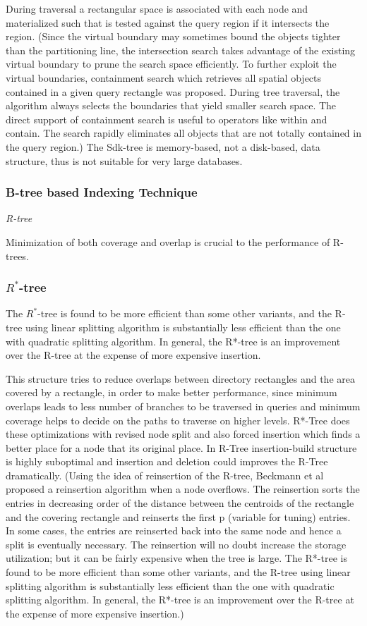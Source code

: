 \documentclass[a4paper,12pt]{article}
\begin{document}
During traversal a rectangular space is associated with each node and materialized  such that is tested against the query region if it intersects the region. 
(Since the virtual boundary may sometimes bound the objects tighter than the partitioning line, the intersection search takes advantage of the existing virtual boundary to prune the search space efficiently. To further exploit the virtual boundaries, containment search which retrieves all spatial objects contained in a given query rectangle was proposed. During tree traversal, the algorithm always selects the boundaries that yield smaller search space. The direct support of containment search is useful to operators like within and contain. The search rapidly eliminates all objects that are not totally contained in the query region.)
The Sdk-tree is memory-based, not a disk-based, data structure, thus is not suitable for very large databases.

\subsubsection{B-tree based Indexing Technique}
\emph{R-tree}
\label{rtree}

Minimization of both coverage and overlap is crucial to the performance of R-trees.
\subsubsection{$R^*$-tree}
The $R^*$-tree is found to be more efficient than some other variants, and the R-tree using linear splitting algorithm is substantially less efficient than the one with quadratic splitting algorithm. In general, the R*-tree is an improvement over the R-tree at the expense of more expensive insertion.

This structure tries to reduce overlaps between directory rectangles and the area covered by a rectangle, in order to make better performance, since minimum overlaps leads to less number of branches to be traversed in queries and minimum coverage helps to decide on the paths to traverse on higher levels. 
R*-Tree does these optimizations with revised node split and also forced insertion which finds a better place for a node that its original place. In R-Tree insertion-build structure is highly suboptimal and insertion and deletion could improves the R-Tree dramatically.
 (Using the idea of reinsertion of the R-tree, Beckmann et al proposed a reinsertion algorithm when a node overflows. The reinsertion sorts the entries in decreasing order of the distance between the centroids of the rectangle and the covering rectangle and reinserts the first p (variable for tuning) entries. In some cases, the entries are reinserted back into the same node and hence a split is eventually necessary. The reinsertion will no doubt increase the storage utilization; but it can be fairly expensive when the tree is large. The R*-tree is found to be more efficient than some other variants, and the R-tree using linear splitting algorithm is substantially less efficient than the one with quadratic splitting algorithm. In general, the R*-tree is an improvement over the R-tree at the expense of more expensive insertion.)
\end{document}

